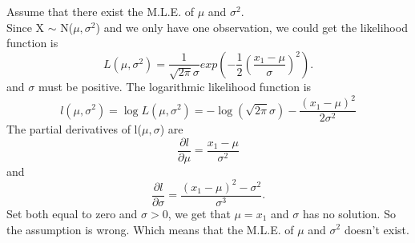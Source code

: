 \documentclass[10.5pt]{article}
\begin{document}
\section{}
Assume that there exist the M.L.E. of $\mu$ and $\sigma^2$.\\\indent
Since X $\sim$ N($\mu,\sigma^2$) and we only have one observation, we could get the likelihood function is $$L(\mu,\sigma^2)=\frac{1}{\sqrt{2\pi}\sigma}exp\left(-\frac{1}{2}\left(\frac{x_1-\mu}{\sigma}\right)^2\right).$$\indent
and $\sigma$ must be positive. The logarithmic likelihood function is $$l(\mu,\sigma^2)=\log L(\mu,\sigma^2)=-\log(\sqrt{2\pi}\sigma)-\frac{(x_1-\mu)^2}{2\sigma^2}$$\indent
The partial derivatives of l($\mu,\sigma$) are $$\frac{\partial l}{\partial \mu}=\frac{x_1-\mu}{\sigma^2}$$\indent
and $$\frac{\partial l}{\partial\sigma}=\frac{(x_1-\mu)^2-\sigma^2}{\sigma^3}.$$\indent
Set both equal to zero and $\sigma>0$, we get that $\mu=x_1$ and $\sigma$ has no solution. So the assumption is wrong. Which means that the M.L.E. of $\mu$ and $\sigma^2$ doesn't exist.
\end{document}
